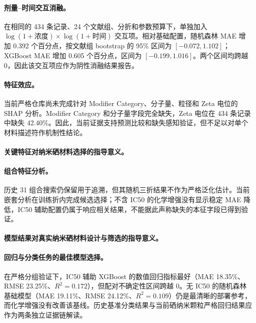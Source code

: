 \paragraph{剂量--时间交互消融。}
在相同的 434 条记录、24 个文献组、分折和参数预算下，单独加入 $\log(1+浓度)\times\log(1+时间)$ 交互项。相对基础配置，随机森林 MAE 增加 0.392 个百分点，按文献组 bootstrap 的 95\% 区间为 $[-0.072,1.102]$；XGBoost MAE 增加 0.605 个百分点，区间为 $[-0.199,1.016]$。两个区间均跨越 0，因此该交互项应作为阴性消融结果报告。

\paragraph{特征效应。}
当前严格仓库尚未完成针对 Modifier Category、分子量、粒径和 Zeta 电位的 SHAP 分析。Modifier Category 和分子量字段完全缺失，Zeta 电位在 434 条记录中缺失 42.40\%。因此，当前证据支持预测比较和缺失感知验证，但不足以对单个材料描述符作机制性结论。

\paragraph{关键特征对纳米硒材料选择的指导意义。}

\paragraph{组合特征分析。}
历史 31 组合搜索仍保留用于追溯，但其随机三折结果不作为严格泛化估计。当前嵌套分析在训练折内完成候选选择；不含 IC50 的化学增强没有显示稳定 MAE 降低，IC50 辅助配置仍属于响应相关结果，不能据此声称缺失的本征字段已得到验证。

\paragraph{模型结果对真实纳米硒材料设计与筛选的指导意义。}

\paragraph{回归与分类任务的最佳模型选择。}
在严格分组验证下，IC50 辅助 XGBoost 的数值回归指标最好（MAE 18.35\%、RMSE 23.25\%、$R^2=0.172$），但配对不确定性区间跨越 0。无 IC50 的随机森林基础模型（MAE 19.11\%、RMSE 24.12\%、$R^2=0.109$）仍是最清晰的部署参考，而化学增强没有改善该基线。历史基准分类结果与当前硒纳米颗粒严格回归结果应作为两条独立证据链解读。

